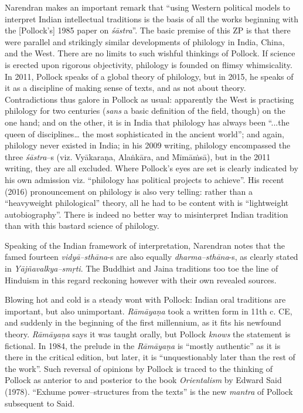 Narendran makes an important remark that “using Western political models to interpret Indian intellectual traditions is the basis of all the works beginning with the [Pollock’s] 1985 paper on \textit{śāstra}”. The basic premise of this ZP is that there were parallel and strikingly similar developments of philology in India, China, and the West. There are no limits to such wishful thinkings of Pollock. If science is erected upon rigorous objectivity, philology is founded on flimsy whimsicality. In 2011, Pollock speaks of a global theory of philology, but in 2015, he speaks of it as a discipline of making sense of texts, and as not about theory. Contradictions thus galore in Pollock as usual: apparently the West is practising philology for two centuries (\textit{sans} a basic definition of the field, though) on the one hand; and on the other, it is in India that philology has always been “...the queen of disciplines… the most sophisticated in the ancient world”; and again, philology never existed in India; in his 2009 writing, philology encompassed the three \textit{śāstra}–s (viz. Vyākaraṇa, Alaṅkāra, and Mīmāṁsā), but in the 2011 writing, they are all excluded. Where Pollock’s eyes are set is clearly indicated by his own admission viz. “philology has political projects to achieve”. His recent (2016) pronouncement on philology is also very telling: rather than a “heavyweight philological” theory, all he had to be content with is “lightweight autobiography”. There is indeed no better way to misinterpret Indian tradition than with this bastard science of philology.

Speaking of the Indian framework of interpretation, Narendran notes that the famed fourteen \textit{vidyā–sthāna}-s are also equally \textit{dharma–sthāna}-s, as clearly stated in \textit{Yājñavalkya–smṛti}. The Buddhist and Jaina traditions too toe the line of Hinduism in this regard reckoning however with their own revealed sources.

Blowing hot and cold is a steady wont with Pollock: Indian oral traditions are important, but also unimportant. \textit{Rāmāyaṇa} took a written form in 11th c. CE, and suddenly in the beginning of the first millennium, as it fits his newfound theory. \textit{Rāmāyaṇa} says it was taught orally, but Pollock \textit{knows} the statement is fictional. In 1984, the prelude in the \textit{Rāmāyaṇa} is “mostly authentic” as it is there in the critical edition, but later, it is “unquestionably later than the rest of the work”. Such reversal of opinions by Pollock is traced to the thinking of Pollock as anterior to and posterior to the book \textit{Orientalism} by Edward Said (1978). “Exhume power–structures from the texts” is the new \textit{mantra} of Pollock subsequent to Said.

